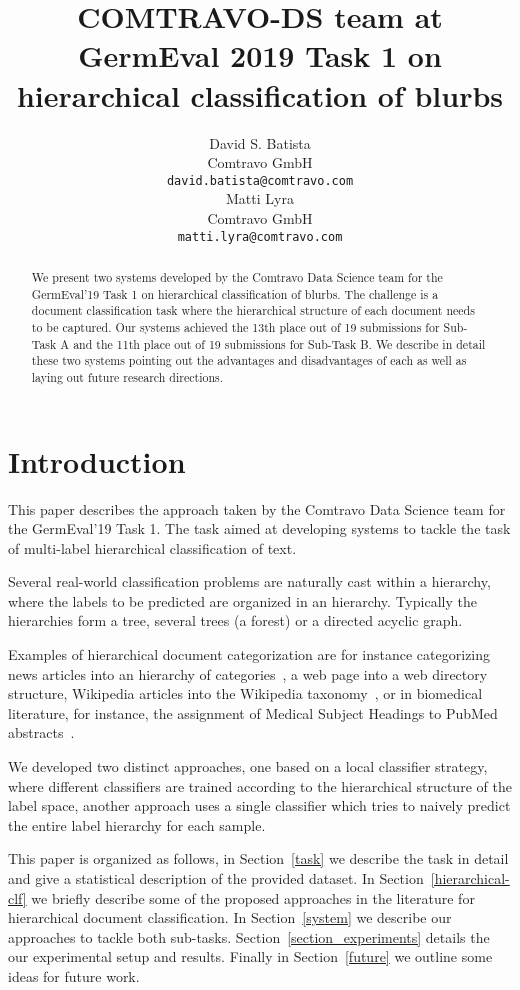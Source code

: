 \documentclass[11pt,a4paper]{article}
\title{COMTRAVO-DS team at GermEval 2019 Task 1 on hierarchical classification of blurbs}
\author{David S. Batista \\
  Comtravo GmbH \\
  {\tt david.batista@comtravo.com} \\\And
  Matti Lyra \\
  Comtravo GmbH \\
  {\tt matti.lyra@comtravo.com} \\}
\date{}
\begin{document}
\maketitle

\begin{abstract}
We present two systems developed by the Comtravo Data Science team for the GermEval'19 Task 1
on hierarchical classification of blurbs. The challenge is a document classification
task where the hierarchical structure of each document needs to be captured. Our
systems achieved the 13th place out of 19 submissions for Sub-Task A and the 11th
place out of 19 submissions for Sub-Task B. We describe in detail these two
systems pointing out the advantages and disadvantages of each as well as laying
out future research directions.
\end{abstract}




\section{Introduction}

This paper describes the approach taken by the Comtravo Data Science team
for the GermEval'19 Task 1. The task aimed at developing systems to tackle the
task of multi-label hierarchical classification of text.

Several real-world classification problems are naturally cast within a hierarchy,
where the labels to be predicted are organized in an hierarchy. Typically the
hierarchies form a tree, several trees (a forest) or a directed acyclic graph.

Examples of hierarchical document categorization are for instance categorizing
news articles into an hierarchy of categories~\cite{Lewis:2004:RNB:1005332.1005345},
a web page into a web directory structure, Wikipedia articles into the
Wikipedia taxonomy~\cite{PartalasKBAPGAA15}, or in biomedical literature, for
instance, the assignment of Medical Subject Headings to PubMed
abstracts~\cite{lipscomb2000medical}.

We developed two distinct approaches, one based on a local classifier strategy,
where different classifiers are trained according to the hierarchical structure of
the label space, another approach uses a single classifier which tries to naively
predict the entire label hierarchy for each sample.

This paper is organized as follows, in Section~\ref{task} we describe the task in
detail and give a statistical description of the provided dataset. In
Section~\ref{hierarchical-clf} we briefly describe some of the proposed approaches in
the literature for hierarchical document classification. In Section~\ref{system}
we describe our approaches to tackle both sub-tasks. Section~\ref{section_experiments}
details the our experimental setup and results. Finally in Section~\ref{future} we
outline some ideas for future work.
\end{document}
